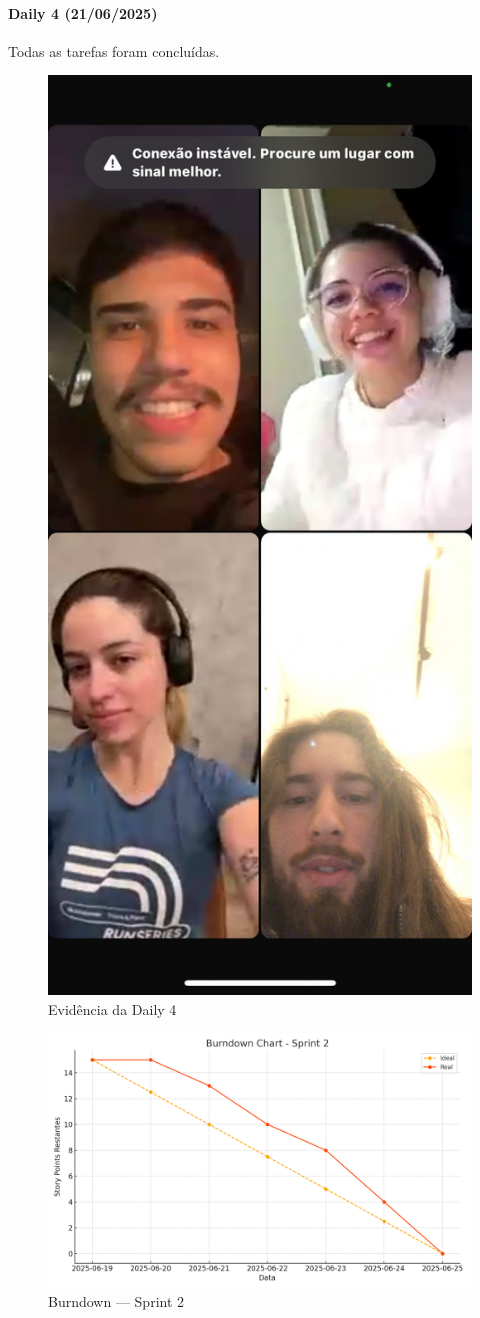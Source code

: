 \paragraph{Daily 4 (21/06/2025)} Todas as tarefas foram concluídas.

\begin{figure}[htbp]
  \centering
  \includegraphics[width=0.6\linewidth]{pictures/daily4.png}
  \caption{Evidência da Daily 4}
\end{figure}

\begin{figure}[htbp]
  \centering
  \includegraphics[width=0.7\linewidth]{pictures/burndown_sprint2.png}
  \caption{Burndown — Sprint 2}
\end{figure}

